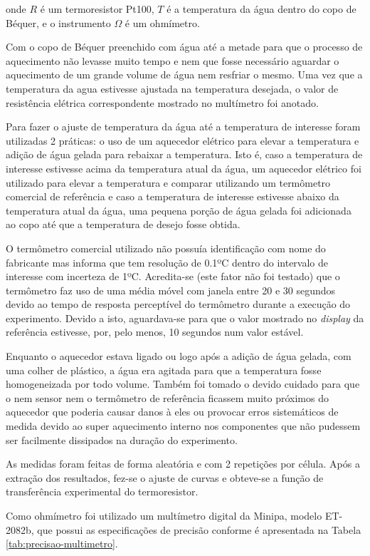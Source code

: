 \documentclass[a4paper]{instrumentacao}
\begin{document}
\noindent
onde $R$ é um termoresistor Pt100, $T$ é a temperatura da água dentro do copo de Béquer, e o instrumento $\Omega$ é um ohmímetro.

Com o copo de Béquer preenchido com água até a metade para que o processo de aquecimento não levasse muito tempo e nem que fosse necessário aguardar o aquecimento de um grande volume de água nem resfriar o mesmo. Uma vez que a temperatura da agua estivesse ajustada na temperatura desejada, o valor de resistência elétrica correspondente mostrado no multímetro foi anotado.

Para fazer o ajuste de temperatura da água até a temperatura de interesse foram utilizadas 2 práticas: o uso de um aquecedor elétrico para elevar a temperatura e adição de água gelada para rebaixar a temperatura. Isto é, caso a temperatura de interesse estivesse acima da temperatura atual da água, um aquecedor elétrico foi utilizado para elevar a temperatura e comparar utilizando um termômetro comercial de referência e caso a temperatura de interesse estivesse abaixo da temperatura atual da água, uma pequena porção de água gelada foi adicionada ao copo até que a temperatura de desejo fosse obtida.

O termômetro comercial utilizado não possuía identificação com nome do fabricante mas informa que tem resolução de 0.1ºC dentro do intervalo de interesse com incerteza de 1ºC. Acredita-se (este fator não foi testado) que o termômetro faz uso de uma média móvel com janela entre 20 e 30 segundos devido ao tempo de resposta perceptível do termômetro durante a execução do experimento. Devido a isto, aguardava-se para que o valor mostrado no \textit{display} da referência estivesse, por, pelo menos, 10 segundos num valor estável.

Enquanto o aquecedor estava ligado ou logo após a adição de água gelada, com uma colher de plástico, a água era agitada para que a temperatura fosse homogeneizada por todo volume. Também foi tomado o devido cuidado para que o nem sensor nem o termômetro de referência ficassem muito próximos do aquecedor que poderia causar danos à eles ou provocar erros sistemáticos de medida devido ao super aquecimento interno nos componentes que não pudessem ser facilmente dissipados na duração do experimento.

As medidas foram feitas de forma aleatória e com 2 repetições por célula. Após a extração dos resultados, fez-se o ajuste de curvas e obteve-se a função de transferência experimental do termoresistor.

Como ohmímetro foi utilizado um multímetro digital da Minipa, modelo ET-2082b, que possui as especificações de precisão conforme é apresentada na Tabela \ref{tab:precisao-multimetro}. 
\end{document}

